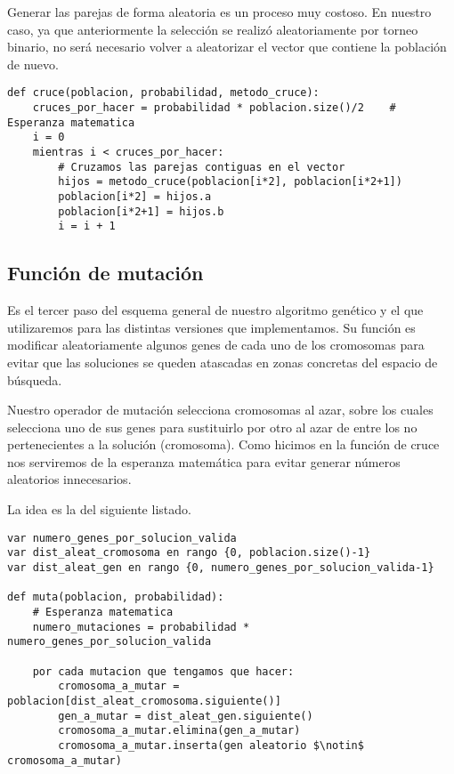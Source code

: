 Generar las parejas de forma aleatoria es un proceso muy costoso. En nuestro caso, ya que
anteriormente la selección se realizó aleatoriamente por torneo binario, no será necesario
volver a aleatorizar el vector que contiene la población de nuevo.

\begin{minipage}{\textwidth}
\begin{lstlisting}[mathescape=true,caption={Definición de la función de cruce.},captionpos=b]
def cruce(poblacion, probabilidad, metodo_cruce):
	cruces_por_hacer = probabilidad * poblacion.size()/2	# Esperanza matematica
	i = 0
	mientras i < cruces_por_hacer:
		# Cruzamos las parejas contiguas en el vector
		hijos = metodo_cruce(poblacion[i*2], poblacion[i*2+1])
		poblacion[i*2] = hijos.a
		poblacion[i*2+1] = hijos.b
		i = i + 1
\end{lstlisting}
\end{minipage}

\subsection{Función de mutación}

Es el tercer paso del esquema general de nuestro algoritmo genético y el que utilizaremos para las
distintas versiones que implementamos. Su función es modificar aleatoriamente algunos genes de
cada uno de los cromosomas para evitar que las soluciones se queden atascadas en zonas concretas
del espacio de búsqueda.

Nuestro operador de mutación selecciona cromosomas al azar, sobre los cuales selecciona uno de
sus genes para sustituirlo por otro al azar de entre los no pertenecientes a la solución (cromosoma).
Como hicimos en la función de cruce nos serviremos de la esperanza matemática para evitar generar números
aleatorios innecesarios.

La idea es la del siguiente listado.

\begin{minipage}{\textwidth}
\begin{lstlisting}[mathescape=true,caption={Definición de la función de mutación.},captionpos=b]
var numero_genes_por_solucion_valida
var dist_aleat_cromosoma en rango {0, poblacion.size()-1}
var dist_aleat_gen en rango {0, numero_genes_por_solucion_valida-1}

def muta(poblacion, probabilidad):
	# Esperanza matematica
	numero_mutaciones = probabilidad * numero_genes_por_solucion_valida
	
	por cada mutacion que tengamos que hacer:
		cromosoma_a_mutar = poblacion[dist_aleat_cromosoma.siguiente()]
		gen_a_mutar = dist_aleat_gen.siguiente()
		cromosoma_a_mutar.elimina(gen_a_mutar)
		cromosoma_a_mutar.inserta(gen aleatorio $\notin$ cromosoma_a_mutar)
\end{lstlisting}
\end{minipage}

